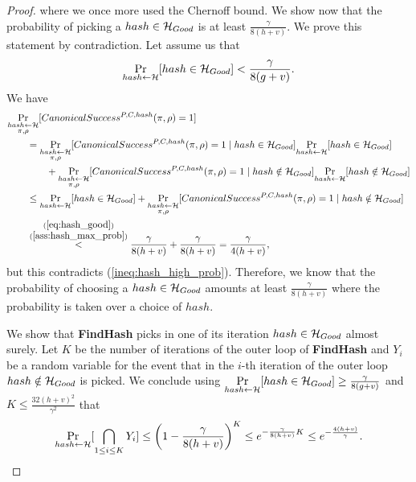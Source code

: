 \begin{proof}
where we once more used the Chernoff bound.
We show now that the probability of picking a $hash \in \mathcal{H}_{Good}$ is at least $\frac{\gamma}{8(h+v)}$.
We prove this statement by contradiction. Let assume us that
\begin{align}
  \label{ass:hash_max_prob}
\underset{hash \leftarrow \mathcal{H}}{\Pr}[hash \in \mathcal{H}_{Good}] < \frac{\gamma}{8(g+v)}.
\end{align}
We have
\begin{align*}
  &\underset{\substack{hash \leftarrow \mathcal{H} \\ \pi, \rho}}{\Pr}[CanonicalSuccess^{P,C,hash}(\pi, \rho) = 1] \\
  &\mbox\qquad = \underset{\substack{ hash \leftarrow \mathcal{H} \\ \pi, \rho}}{\Pr}[CanonicalSuccess^{P,C,hash}(\pi, \rho) = 1 \mid hash \in \mathcal{H}_{Good}]
  \underset{hash \leftarrow \mathcal{H}}{\Pr}[hash \in \mathcal{H}_{Good}] \\
  & \mbox\qquad\qquad + \underset{\substack{hash \leftarrow \mathcal{H} \\ \pi, \rho}}{\Pr}[CanonicalSuccess^{P,C,hash}(\pi, \rho) = 1 \mid hash \notin \mathcal{H}_{Good}]
  \underset{hash \leftarrow \mathcal{H}}{\Pr}[hash \notin \mathcal{H}_{Good}] \\
  & \mbox\qquad \leq \underset{hash \leftarrow \mathcal{H}}{\Pr}[hash \in \mathcal{H}_{Good}] +
  \underset{\substack{hash \leftarrow \mathcal{H} \\ \pi, \rho}}{\Pr}[CanonicalSuccess^{P,C,hash}(\pi, \rho) = 1 \mid hash \notin \mathcal{H}_{Good}] \\
  & \mbox\qquad  \stackrel{\substack{ (\ref{eq:hash_good}) \\ (\ref{ass:hash_max_prob})}}{<} \frac{\gamma}{8(h+v)} + \frac{\gamma}{8(h+v)} = \frac{\gamma}{4(h+v)},
\end{align*}
but this contradicts (\ref{ineq:hash_high_prob}).
Therefore, we know that the probability of choosing a $hash \in \mathcal{H}_{Good}$ amounts at least $\frac{\gamma}{8(h+v)}$
where the probability is taken over a choice of $hash$.

We show that \textbf{FindHash} picks in one of its iteration $hash \in \mathcal{H}_{Good}$ almost surely.
Let $K$ be the number of iterations of the outer loop of \textbf{FindHash} and $Y_i$ be a random variable for the event
that in the $i$-th iteration of the outer loop $hash \notin \mathcal{H}_{Good}$ is picked.
We conclude using $\underset{hash \leftarrow \mathcal{H}}{\Pr}[hash \in \mathcal{H}_{Good}] \geq \frac{\gamma}{8(g+v)}$ and $K \leq \frac{32(h+v)^2}{\gamma^2}$ that
\begin{align*}
  \underset{hash \leftarrow \mathcal{H}}{\Pr}[ \bigcap_{1 \leq i \leq K} Y_i ] \leq \left(1 - \frac{\gamma}{8(h+v)}\right)^{K}
    \leq e^{-\frac{\gamma}{8(h+v)} K}
    \leq e^{-\frac{4(h+v)}{\gamma}}.
\end{align*}
\end{proof}

